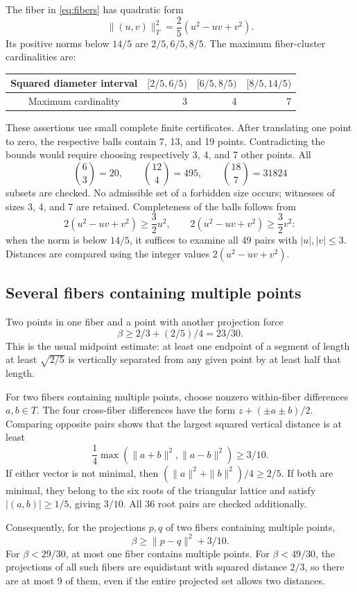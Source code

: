 \documentclass[11pt,a4paper]{article}
\theoremstyle{remark}\newtheorem{remark}[theorem]{Remark}
\begin{document}
The fiber in \eqref{eq:fibers} has quadratic form
\[
\| (u,v)\|_T^2=\frac25(u^2-uv+v^2).
\]
Its positive norms below $14/5$ are $2/5,6/5,8/5$. The maximum fiber-cluster cardinalities are:
\begin{center}
\begin{tabular}{crrr}
\toprule
Squared diameter interval &$[2/5,6/5)$&$[6/5,8/5)$&$[8/5,14/5)$\\\midrule
Maximum cardinality &3&4&7\\
\bottomrule
\end{tabular}
\end{center}
These assertions use small complete finite certificates. After translating one point to zero, the respective balls contain 7, 13, and 19 points. Contradicting the bounds would require choosing respectively 3, 4, and 7 other points. All
\[
\binom63=20,\qquad \binom{12}4=495,\qquad \binom{18}7=31824
\]
subsets are checked. No admissible set of a forbidden size occurs; witnesses of sizes 3, 4, and 7 are retained. Completeness of the balls follows from
\[
2(u^2-uv+v^2)\ge\frac32u^2,\qquad
2(u^2-uv+v^2)\ge\frac32v^2:
\]
when the norm is below $14/5$, it suffices to examine all 49 pairs with $|u|,|v|\le3$. Distances are compared using the integer values $2(u^2-uv+v^2)$.

\subsection{Several fibers containing multiple points}

Two points in one fiber and a point with another projection force
\[
\beta\ge2/3+(2/5)/4=23/30.
\]
This is the usual midpoint estimate: at least one endpoint of a segment of length at least $\sqrt{2/5}$ is vertically separated from any given point by at least half that length.

For two fibers containing multiple points, choose nonzero within-fiber differences $a,b\in T$. The four cross-fiber differences have the form $z+(\pm a\pm b)/2$. Comparing opposite pairs shows that the largest squared vertical distance is at least
\[
\frac14\max(\|a+b\|^2,\|a-b\|^2)\ge3/10.
\]
If either vector is not minimal, then $(\|a\|^2+\|b\|^2)/4\ge2/5$. If both are minimal, they belong to the six roots of the triangular lattice and satisfy $|(a,b)|\ge1/5$, giving $3/10$. All 36 root pairs are checked additionally.

Consequently, for the projections $p,q$ of two fibers containing multiple points,
\begin{equation}\label{eq:twoheavy10}
\beta\ge\|p-q\|^2+3/10.
\end{equation}
For $\beta<29/30$, at most one fiber contains multiple points. For $\beta<49/30$, the projections of all such fibers are equidistant with squared distance $2/3$, so there are at most 9 of them, even if the entire projected set allows two distances.
\end{document}
